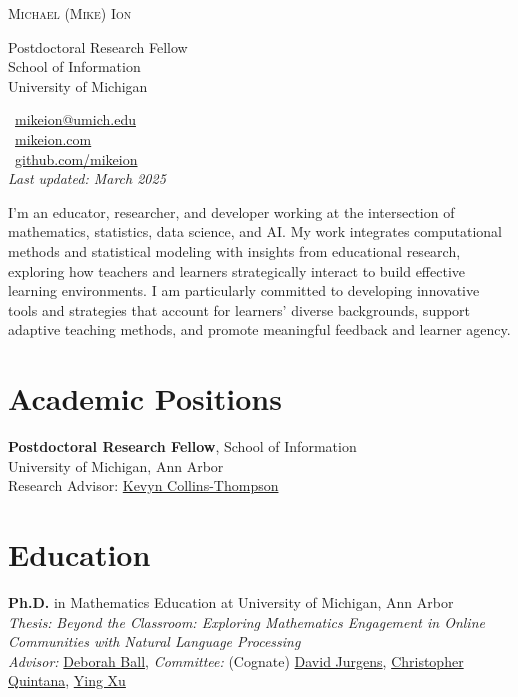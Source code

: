 \documentclass[a4paper,11pt]{article}
\newcommand{\years}[1]{%
  {\reversemarginpar\strut\marginnote{{\small#1}}}%
}
\begin{document}
{
  \begin{minipage}[t]{0.7\textwidth}
    \Huge \textsc{Michael (Mike) Ion}
    \vspace{0.5em}
    
    \normalsize Postdoctoral Research Fellow\\
    School of Information\\
    University of Michigan
  \end{minipage}
  \hfill
  \begin{minipage}[t]{0.3\textwidth}
    \raggedleft
    \small
    \faEnvelope~\href{mailto:mikeion@umich.edu}{mikeion@umich.edu}\\
    \faGlobe~\href{https://mikeion.com}{mikeion.com}\\
    \faGithub~\href{https://github.com/mikeion}{github.com/mikeion}\\[1em]
    \textit{Last updated: March 2025}
  \end{minipage}
}

\vspace{1em}

I'm an educator, researcher, and developer working at the intersection of mathematics, statistics, data science, and AI. My work integrates computational methods and statistical modeling with insights from educational research, exploring how teachers and learners strategically interact to build effective learning environments. I am particularly committed to developing innovative tools and strategies that account for learners' diverse backgrounds, support adaptive teaching methods, and promote meaningful feedback and learner agency.

\section*{Academic Positions}

\years{2024--Present}\textbf{Postdoctoral Research Fellow}, School of Information\\
University of Michigan, Ann Arbor\\
Research Advisor: \href{https://websites.umich.edu/~kevynct/}{Kevyn Collins-Thompson}

\section*{Education}

\years{2017--2024} \textbf{Ph.D.} in Mathematics Education at University of Michigan, Ann Arbor\\
\emph{Thesis:} \emph{Beyond the Classroom: Exploring Mathematics Engagement in Online Communities with Natural Language Processing}\\
\emph{Advisor:} \href{https://deborahloewenbergball.com/}{Deborah Ball}, \emph{Committee:} (Cognate) \href{https://jurgens.people.si.umich.edu/}{David Jurgens}, \href{https://marsal.umich.edu/directory/faculty-staff/christopher-quintana}{Christopher Quintana}, \href{https://www.gse.harvard.edu/directory/faculty/ying-xu}{Ying Xu}
\end{document}

